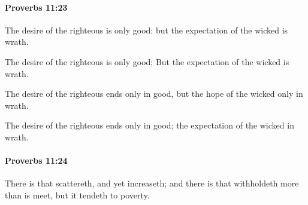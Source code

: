 		\paragraph{Proverbs 11:23} %
			\label{PROVERBS-11-23}

			The desire of the righteous is only good: but the expectation of the wicked is wrath.

			\begin{versebox}
					\item[BHS] 
					\item[ASV] The desire of the righteous is only good; But the expectation of the wicked is wrath.
					\item[NIV] The desire of the righteous ends only in good, but the hope of the wicked only in wrath.
					\item[NRSV] The desire of the righteous ends only in good; the expectation of the wicked in wrath.
			\end{versebox}

		\paragraph{Proverbs 11:24} %
			\label{PROVERBS-11-24}

			There is that scattereth, and yet increaseth; and there is that withholdeth more than is meet, but it tendeth to poverty.

